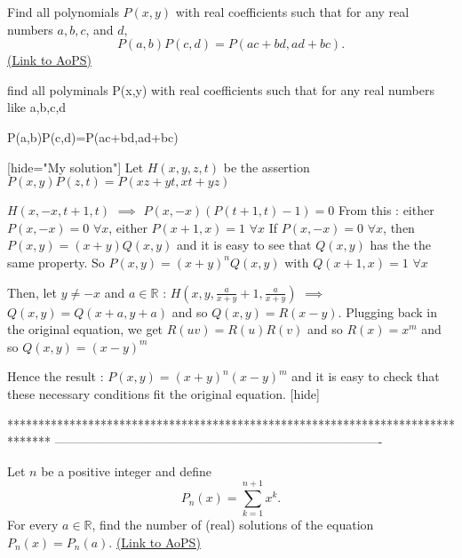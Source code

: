 \begin{problem}
	Find all polynomials $P(x,y)$ with real coefficients such that for any real numbers $a,b,c$, and $d$,
\[P(a,b)P(c,d)=P(ac+bd,ad+bc).\]
	\flushright \href{https://artofproblemsolving.com/community/c6h232728}{(Link to AoPS)}
\end{problem}



\begin{solution}
	\begin{tcolorbox}find all polyminals P(x,y) with real coefficients such that for any real numbers like a,b,c,d

P(a,b)P(c,d)=P(ac+bd,ad+bc)\end{tcolorbox}

[hide="My solution"]
Let $ H(x,y,z,t)$ be the assertion $ P(x,y)P(z,t)=P(xz+yt,xt+yz)$

$ H(x,-x,t+1,t)$ $ \implies$ $ P(x,-x)(P(t+1,t)-1)=0$
From this : either $ P(x,-x)=0$ $ \forall x$, either $ P(x+1,x)=1$ $ \forall x$
If $ P(x,-x)=0$ $ \forall x$, then $ P(x,y)=(x+y)Q(x,y)$ and it is easy to see that $ Q(x,y)$ has the the same property.
So $ P(x,y)=(x+y)^nQ(x,y)$ with $ Q(x+1,x)=1$ $ \forall x$

Then, let $ y\neq -x$ and $ a\in\mathbb R$ : $ H(x,y,\frac{a}{x+y}+1,\frac{a}{x+y})$ $ \implies$ $ Q(x,y)=Q(x+a,y+a)$ and so $ Q(x,y)=R(x-y)$. Plugging back in the original equation, we get $ R(uv)=R(u)R(v)$ and so $ R(x)=x^m$ and so $ Q(x,y)=(x-y)^m$

Hence the result : $ P(x,y)=(x+y)^n(x-y)^m$ and it is easy to check that these necessary conditions fit the original equation.
[\/hide]
\end{solution}
*******************************************************************************
-------------------------------------------------------------------------------

\begin{problem}
	Let $n$ be a positive integer and define \[P_n(x) = \sum_{k = 1}^{n + 1}x^k.\]
For every $ a\in\mathbb{R}$, find the number of (real) solutions of the equation $ P_n(x) = P_n(a)$.
	\flushright \href{https://artofproblemsolving.com/community/c6h253822}{(Link to AoPS)}
\end{problem}



